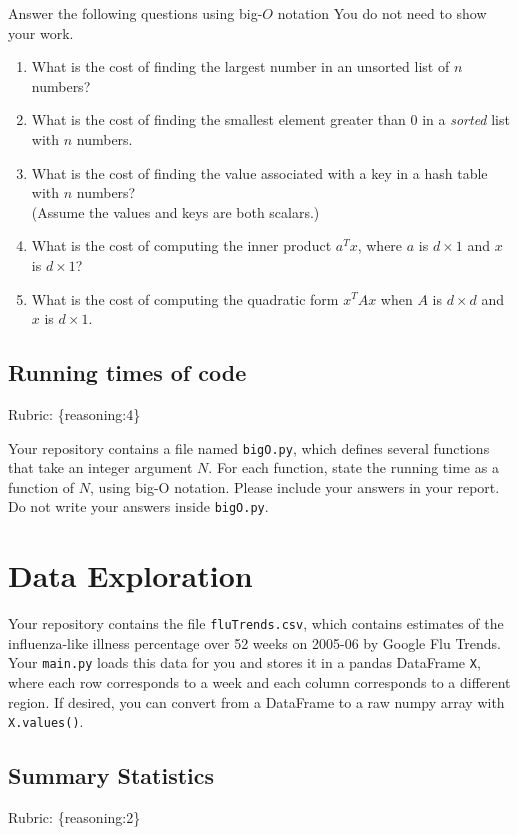 \documentclass{article}
\def\rubric#1{\gre{Rubric: \{#1\}}}{}
\def\blu#1{{\color{blu}#1}}
\def\gre#1{{\color{gre}#1}}
\begin{document}
\blu{Answer the following questions using big-$O$ notation} You do not need to show your work.
\begin{enumerate}
\item What is the cost of finding the largest number in an unsorted list of $n$ numbers?
\item What is the cost of finding the smallest element greater than 0 in a \emph{sorted} list with $n$ numbers.
\item What is the cost of finding the value associated with a key in a hash table with $n$ numbers? \\(Assume the values and keys are both scalars.)
\item What is the cost of computing the inner product $a^Tx$, where $a$ is $d \times 1$ and $x$ is $d \times 1$?
\item What is the cost of computing the quadratic form $x^TAx$ when $A$ is $d \times d$ and $x$ is $d \times 1$.
\end{enumerate}

\subsection{Running times of code}
\rubric{reasoning:4}

Your repository contains a file named \texttt{bigO.py}, which defines several functions
that take an integer argument $N$. For each function, \blu{state the running time as a function of $N$, using big-O notation}.
Please include your answers in your report. Do not write your answers inside \texttt{bigO.py}.

\section{Data Exploration}


Your repository contains the file \texttt{fluTrends.csv}, which contains estimates
of the influenza-like illness percentage over 52 weeks on 2005-06 by Google Flu Trends.
Your \texttt{main.py} loads this data for you and stores it in a pandas DataFrame \texttt{X},
where each row corresponds to a week and each column
corresponds to a different
region. If desired, you can convert from a DataFrame to a raw numpy array with \texttt{X.values()}.

\subsection{Summary Statistics}
\rubric{reasoning:2}
\end{document}
